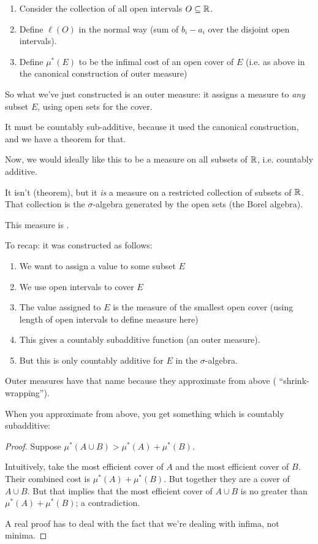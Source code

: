 \begin{example}
  \begin{enumerate}
  \item Consider the collection of all open intervals $O \subseteq \mathbb{R}$.
  \item Define $\ell(O)$ in the normal way (sum of $b_i - a_i$ over the disjoint open intervals).
  \item Define $\mu^*(E)$ to be the infimal cost of an open cover of $E$ (i.e. as above in the canonical
    construction of outer measure)
  \end{enumerate}
  So what we've just constructed is an outer measure: it assigns a measure to {\it any} subset $E$, using open sets
  for the cover.

  It must be countably sub-additive, because it used the canonical construction, and we have a theorem for that.

  Now, we would ideally like this to be a measure on all subsets of $\mathbb{R}$, i.e. countably additive.

  It isn't (theorem), but it {\it is} a measure on a restricted collection of subsets of $\mathbb{R}$. That collection is
  the $\sigma$-algebra generated by the open sets (the Borel algebra).

  This measure is .

  To recap: it was constructed as follows:
  \begin{enumerate}
  \item We want to assign a value to some subset $E$
  \item We use open intervals to cover $E$
  \item The value assigned to $E$ is the measure of the smallest open cover (using length of open intervals to
    define measure here)
  \item This gives a countably subadditive function (an outer measure).
  \item But this is only countably additive for $E$ in the $\sigma$-algebra.
  \end{enumerate}
\end{example}

\begin{intuition*}
  Outer measures have that name because they approximate from above ( ``shrink-wrapping​'').

  When you approximate from above, you get something which is countably subadditive:

  \begin{proof}
    Suppose $\mu^*(A \cup B) > \mu^*(A) + \mu^*(B)$.

    Intuitively, take the most efficient cover of $A$ and the most efficient cover of $B$. Their combined cost
    is $\mu^*(A) + \mu^*(B)$. But together they are a cover of $A \cup B$. But that implies that the most
    efficient cover of $A \cup B$ is no greater than $\mu^*(A) + \mu^*(B)$; a contradiction.

    A real proof has to deal with the fact that we're dealing with infima, not minima.
  \end{proof}
\end{intuition*}
